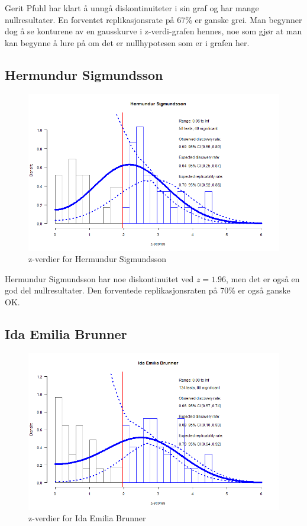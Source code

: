 \documentclass[doc,norsk]{apa7}
\begin{document}
Gerit Pfuhl har klart å unngå diskontinuiteter i sin graf og har mange nullresultater. En forventet replikasjonsrate på 67\% er ganske grei. Man begynner dog å se konturene av en gausskurve i z-verdi-grafen hennes, noe som gjør at man kan begynne å lure på om det er nullhypotesen som er i grafen her.

\subsection{Hermundur Sigmundsson}
\begin{figure}[h!]
    \centering
    \includegraphics[width=\textwidth]{images/Hermundur Sigmundsson.png}
    \caption{z-verdier for Hermundur Sigmundsson}
\end{figure}

Hermundur Sigmundsson har noe diskontinuitet ved $z=1.96$, men det er også en god del nullresultater. Den forventede replikasjonsraten på 70\% er også ganske OK.

\subsection{Ida Emilia Brunner}
\begin{figure}[h!]
    \centering
    \includegraphics[width=\textwidth]{images/Ida Emilia Brunner.png}
    \caption{z-verdier for Ida Emilia Brunner}
\end{figure}
\end{document}
